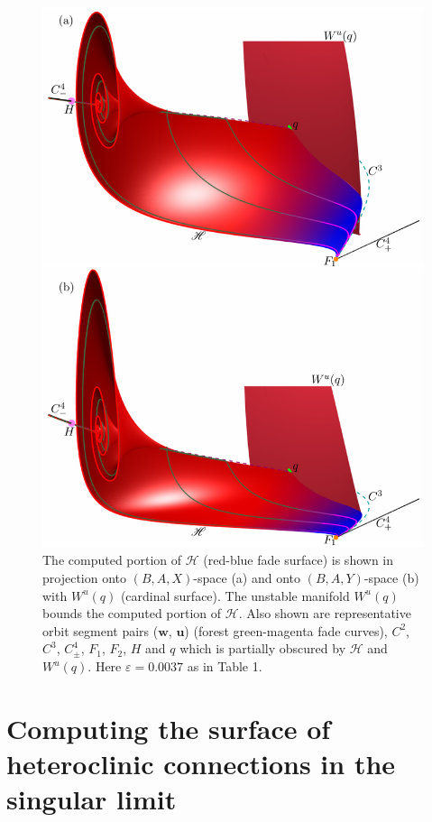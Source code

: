 \documentclass{ws-ijbc}
\begin{document}
\begin{figure}[H]
\centering
\includegraphics[]{./figures/MKMO_12.pdf}
\caption{The computed portion of $\mathscr{H}$ (red-blue fade surface) is shown in projection onto $(B,A,X)$-space (a) and onto $(B,A,Y)$-space (b) with $W^u(q)$ (cardinal surface).  The unstable manifold $W^u(q)$ bounds the computed portion of $\mathscr{H}$.  Also shown are representative orbit segment pairs ($\mathbf{w}$, $\mathbf{u}$) (forest green-magenta fade curves), $C^2$, $C^3$, $C^4_\pm$, $F_1$, $F_2$, $H$ and $q$ which is partially obscured by $\mathscr{H}$ and $W^u(q)$.  Here $\varepsilon=0.0037$ as in Table 1.}
\label{figure_12}
\end{figure}
\section{Computing the surface of heteroclinic connections in the singular limit}
\end{document}
